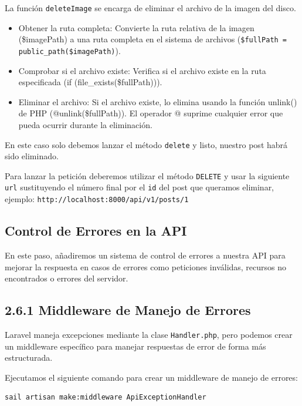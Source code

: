 \documentclass[11pt]{article}
\begin{document}
La función \texttt{deleteImage} se encarga de eliminar el archivo de la
imagen del disco.

\begin{itemize}
\item Obtener la ruta completa: Convierte la ruta relativa de la imagen
(\$imagePath) a una ruta completa en el sistema de archivos
(\texttt{\$fullPath = public\_path(\$imagePath)}).
\item Comprobar si el archivo existe: Verifica si el archivo existe en la
ruta especificada (if (file\_exists(\$fullPath))).
\item Eliminar el archivo: Si el archivo existe, lo elimina usando la
función unlink() de PHP (@unlink(\$fullPath)). El operador @ suprime
cualquier error que pueda ocurrir durante la eliminación.
\end{itemize}

En este caso solo debemos lanzar el método \texttt{delete} y listo, nuestro
post habrá sido eliminado.

Para lanzar la petición deberemos utilizar el método \texttt{DELETE} y usar la
siguiente \texttt{url} sustituyendo el número final por el \texttt{id} del post que
queramos eliminar, ejemplo: \texttt{http://localhost:8000/api/v1/posts/1}

\subsection{Control de Errores en la API}
\label{sec:org31bb50a}

En este paso, añadiremos un sistema de control de errores a nuestra
API para mejorar la respuesta en casos de errores como peticiones
inválidas, recursos no encontrados o errores del servidor.

\subsection{2.6.1 Middleware de Manejo de Errores}
\label{sec:org997c330}

Laravel maneja excepciones mediante la clase \texttt{Handler.php}, pero
podemos crear un middleware específico para manejar respuestas de
error de forma más estructurada.

Ejecutamos el siguiente comando para crear un middleware de manejo de
errores:

\begin{verbatim}
sail artisan make:middleware ApiExceptionHandler
\end{verbatim}
\end{document}
